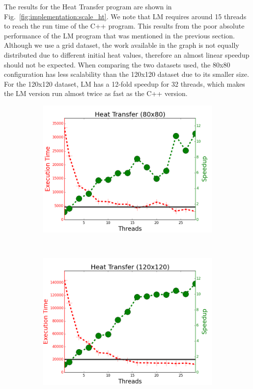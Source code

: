 The results for the Heat Transfer program are shown in
Fig.~\ref{fig:implementation:scale_ht}. We note that LM requires around 15
threads to reach the run time of the C++ program. This results from the poor
absolute performance of the LM program that was mentioned in the previous section.
Although we use a grid dataset, the work available in the graph is not equally
distributed due to different initial heat values, therefore an almost linear
speedup should not be expected. When comparing the two datasets used, the 80x80
configuration has less scalability than the 120x120 dataset due to its smaller
size. For the 120x120 dataset, LM has a 12-fold speedup for 32 threads, which
makes the LM version run almost twice as fast as the C++ version.

\begin{figure}[]
        \begin{subfigure}[b]{\plotsize\textwidth}
                \includegraphics[width=\textwidth]{experiments/scalability/scale-new-heat-transfer-80.png}
                \label{fig:implementation:scale_ht80}
        \end{subfigure}
        ~
        \begin{subfigure}[b]{\plotsize\textwidth}
                \includegraphics[width=\textwidth]{experiments/scalability/scale-new-heat-transfer-120.png}

\end{subfigure}
\end{figure}
